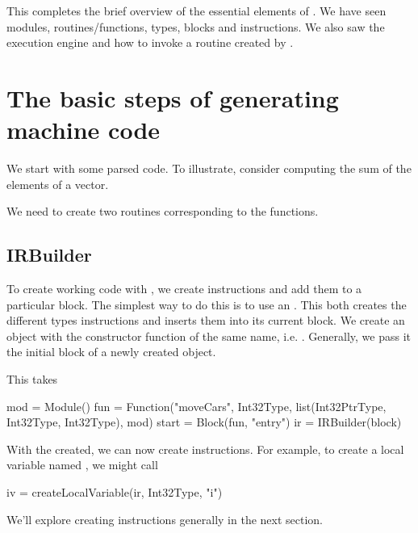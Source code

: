 This completes the brief overview of the essential elements of \llvm.
We have seen modules, routines/functions, types, blocks and
instructions.  We also saw the execution engine and how to 
invoke a routine created by \llvm.


\section{The basic steps of generating machine code}

We start with some parsed code.  To illustrate, consider computing the
sum of the elements of a vector. %

We need to create two routines corresponding to the \R{} functions.






\subsection{IRBuilder}
To create working code with \llvm, we create instructions and add them
to a particular block.  The simplest way to do this is to use an
.  This both creates the different types
instructions and inserts them into its current block.  We create an
 object with the constructor function of the same
name, i.e. .  Generally, we pass it the initial block
of a newly created  object.

This takes 
\begin{RCode}
mod = Module()
fun = Function("moveCars", Int32Type, list(Int32PtrType, Int32Type, Int32Type), mod)
start = Block(fun, "entry")
ir = IRBuilder(block)  
\end{RCode}

With the  created, we can now create instructions.
For example, to create a local variable named , we might
call
\begin{RCode}
iv = createLocalVariable(ir, Int32Type, "i")  
\end{RCode}
We'll explore creating instructions generally in the next
section. 

